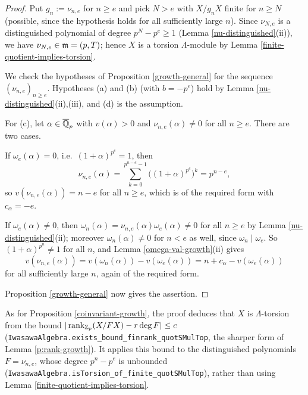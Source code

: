 \begin{proof}
\leanok
{}
Put $g_n:=\nu_{n,e}$ for $n\geq e$ and pick $N>e$ with $X/g_nX$ finite for
$n\geq N$ (possible, since the hypothesis holds for all sufficiently large $n$).
Since $\nu_{N,e}$ is a distinguished polynomial of degree $p^N-p^e\geq 1$
(Lemma \ref{nu-distinguished}(ii)), we have $\nu_{N,e}\in{\mathfrak{m}}=(p,T)$;
hence $X$ is a torsion $\Lambda$-module by
Lemma \ref{finite-quotient-implies-torsion}.

We check the hypotheses of Proposition \ref{growth-general} for the sequence
$(\nu_{n,e})_{n\geq e}$.
Hypotheses (a) and (b) (with $b=-p^e$) hold by
Lemma \ref{nu-distinguished}(ii),(iii), and (d) is the assumption.

For (c), let $\alpha\in\overline{{\mathbb {Q}}}_p$ with $v(\alpha)>0$ and $\nu_{n,e}(\alpha)\neq 0$
for all $n\geq e$. There are two cases.

If $\omega_e(\alpha)=0$, i.e.~$(1+\alpha)^{p^e}=1$, then
$$\nu_{n,e}(\alpha)=\sum_{k=0}^{p^{n-e}-1}\big((1+\alpha)^{p^e}\big)^k=p^{n-e},$$
so $v(\nu_{n,e}(\alpha))=n-e$ for all $n\geq e$, which is of the required form
with $c_\alpha=-e$.

If $\omega_e(\alpha)\neq 0$, then $\omega_n(\alpha)=\nu_{n,e}(\alpha)\omega_e(\alpha)
\neq 0$ for all $n\geq e$ by Lemma \ref{nu-distinguished}(ii); moreover
$\omega_n(\alpha)\neq0$ for $n<e$ as well, since $\omega_n\mid\omega_e$.
So $(1+\alpha)^{p^n}\neq 1$ for all $n$, and
Lemma \ref{omega-val-growth}(ii) gives
$$v(\nu_{n,e}(\alpha))=v(\omega_n(\alpha))-v(\omega_e(\alpha))
=n+c_\alpha-v(\omega_e(\alpha))$$
for all sufficiently large $n$, again of the required form.

Proposition \ref{growth-general} now gives the assertion.
\end{proof}

\begin{remark}
As for Proposition \ref{coinvariant-growth}, the {\Lean} proof deduces that $X$
is $\Lambda$-torsion from the bound $|\operatorname{rank}_{{\mathbb {Z}}_p}(X/FX)-r\deg F|\leq c$
(\texttt{IwasawaAlgebra.exists\_bound\_finrank\_quotSMulTop}, the sharper form
of Lemma \ref{p:rank-growth}). It applies this bound to the distinguished
polynomials $F=\nu_{n,e}$, whose degree $p^n-p^e$ is unbounded
(\texttt{IwasawaAlgebra.isTorsion\_of\_finite\_quotSMulTop}), rather than using
Lemma \ref{finite-quotient-implies-torsion}.
\end{remark}

